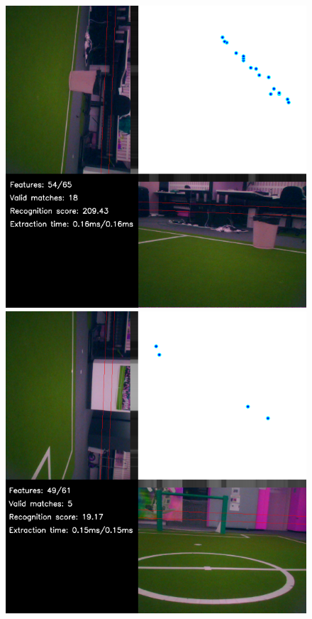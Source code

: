 \documentclass[runningheads,a4paper]{llncs}
\begin{document}
\begin{figure} [h]
\begin{minipage}[b]{0.5\textwidth}
\centering
\includegraphics[width=1\textwidth]{figures/goodmatch.png}
\end{minipage}
\begin{minipage}[b]{0.5\textwidth}
\centering
\includegraphics[width=1\textwidth]{figures/badmatch.png}

\end{minipage}
\end{figure}
\end{document}
